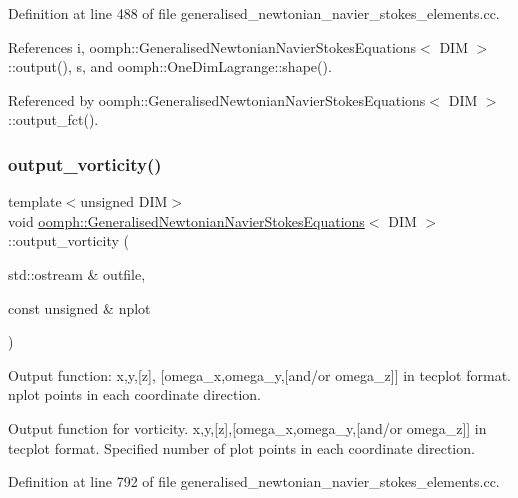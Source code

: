 Definition at line 488 of file generalised\+\_\+newtonian\+\_\+navier\+\_\+stokes\+\_\+elements.\+cc.



References i, oomph\+::\+Generalised\+Newtonian\+Navier\+Stokes\+Equations$<$ D\+I\+M $>$\+::output(), s, and oomph\+::\+One\+Dim\+Lagrange\+::shape().



Referenced by oomph\+::\+Generalised\+Newtonian\+Navier\+Stokes\+Equations$<$ D\+I\+M $>$\+::output\+\_\+fct().

\mbox{\label{classoomph_1_1GeneralisedNewtonianNavierStokesEquations_a6f60781b794442f501d32cb7d8cde2f3}} 
\subsubsection{\texorpdfstring{output\+\_\+vorticity()}{output\_vorticity()}}
{\footnotesize\ttfamily template$<$unsigned D\+IM$>$ \\
void \hyperlink{classoomph_1_1GeneralisedNewtonianNavierStokesEquations}{oomph\+::\+Generalised\+Newtonian\+Navier\+Stokes\+Equations}$<$ D\+IM $>$\+::output\+\_\+vorticity (\begin{DoxyParamCaption}\item[{std\+::ostream \&}]{outfile,  }\item[{const unsigned \&}]{nplot }\end{DoxyParamCaption})}



Output function\+: x,y,\mbox{[}z\mbox{]}, \mbox{[}omega\+\_\+x,omega\+\_\+y,\mbox{[}and/or omega\+\_\+z\mbox{]}\mbox{]} in tecplot format. nplot points in each coordinate direction. 

Output function for vorticity. x,y,\mbox{[}z\mbox{]},\mbox{[}omega\+\_\+x,omega\+\_\+y,\mbox{[}and/or omega\+\_\+z\mbox{]}\mbox{]} in tecplot format. Specified number of plot points in each coordinate direction. 

Definition at line 792 of file generalised\+\_\+newtonian\+\_\+navier\+\_\+stokes\+\_\+elements.\+cc.



